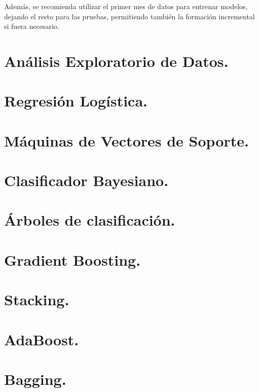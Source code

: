 \documentclass[12pt,letterpaper]{article}
\begin{document}
Además, se recomienda utilizar el primer mes de datos para entrenar modelos, dejando el resto para las pruebas, permitiendo también la formación incremental si fuera necesario.


\section{Análisis Exploratorio de Datos.}
\section{Regresión Logística.}
\section{Máquinas de Vectores de Soporte.}
\section{Clasificador Bayesiano.}
\section{Árboles de clasificación.}
\section{Gradient Boosting.}
\section{Stacking.}
\section{AdaBoost.}
\section{Bagging.}
\printbibliography
\end{document}
